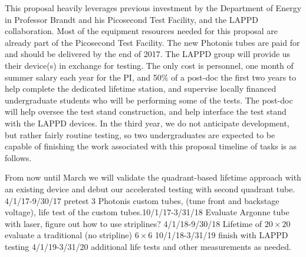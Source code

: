 This proposal heavily leverages previous investment by the Department of Energy in Professor Brandt and his Picosecond Test Facility, and the LAPPD collaboration. Most of the equipment resources needed for this proposal are already part of the Picosecond Test Facility. 
The new Photonis tubes are paid for and should be delivered by the end of 2017.   The LAPPD group will provide us their device(s) in exchange for testing.  The only cost is personnel, one month of summer salary each year for the PI, and 50\% of a post-doc the first two years to help complete the dedicated lifetime station, and supervise locally financed undergraduate students who will be performing some of the tests. The post-doc will help oversee the test stand construction, and help interface the test stand with the LAPPD devices. In the third year, we do not anticipate development, but rather fairly routine testing, so two undergraduates are expected to be capable of finishing the work associated with this proposal timeline of tasks is as follows.


From now until March we will validate the quadrant-based lifetime approach with an existing device and debut our accelerated testing with second quadrant tube. 4/1/17-9/30/17 pretest 3 Photonis custom tubes, (tune front and backstage voltage), life test of the custom tubes.10/1/17-3/31/18 Evaluate Argonne tube with laser, figure out how to use striplines? 4/1/18-9/30/18 Lifetime of $20 \times 20$ evaluate a traditional (no stripline) $6\times 6$  10/1/18-3/31/19 finish with LAPPD testing 4/1/19-3/31/20 additional life tests and other measurements as needed. 
